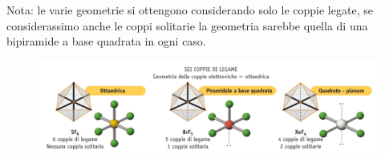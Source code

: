 Nota: le varie geometrie si ottengono considerando solo le coppie legate, se considerassimo anche le coppi solitarie la geometria sarebbe quella di una bipiramide a base quadrata in ogni caso.

\begin{figure}[htp]
    \centering
    \includegraphics[width=14cm]{immagini/geometrie-6-coppie.png}
\end{figure}